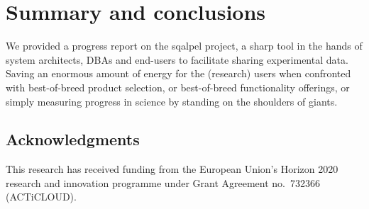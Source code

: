 \documentclass{cidr-2019}
\begin{document}
\section{Summary and conclusions}\label{Summary and conclusions}

We provided a progress report on the {\sc sqalpel} project, a sharp
tool in the hands of system architects, DBAs and end-users to
facilitate sharing experimental data.
Saving an enormous amount of energy for the (research) users when
confronted with best-of-breed product selection, or best-of-breed
functionality offerings, or simply measuring progress in science by
standing on the shoulders of giants.







\subsection*{Acknowledgments} This research has received funding from the European Union's Horizon 2020 research and innovation programme under Grant Agreement no.~732366 (ACTiCLOUD).

{


}
\end{document}
